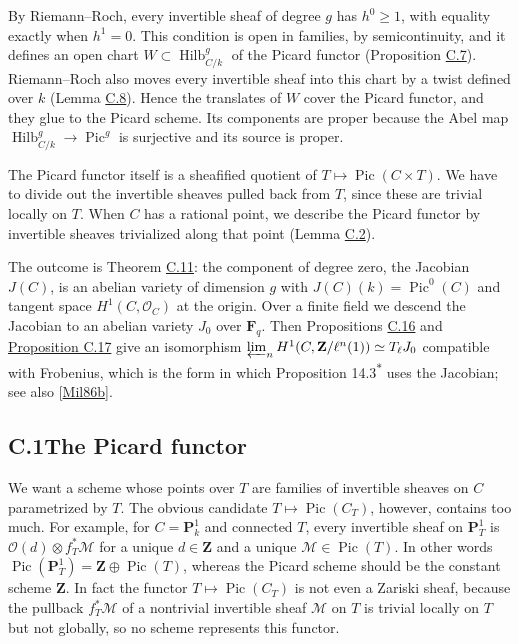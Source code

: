 \documentclass[11pt]{article}
\newcommand{\bpout}[1]{#1\textsuperscript{\hyperlink{bp-outside}{\ensuremath{\ast}}}}
\begin{document}
By Riemann–Roch, every invertible sheaf of degree \(g\) has \(h^0\geq1\), with equality exactly when \(h^1=0\). This condition is open in families, by semicontinuity, and it defines an open chart \(W\subset\operatorname{Hilb}^{g}_{C/k}\) of the Picard functor (Proposition \hyperref[bp24]{C.7}). Riemann–Roch also moves every invertible sheaf into this chart by a twist defined over \(k\) (Lemma \hyperref[bp27]{C.8}). Hence the translates of \(W\) cover the Picard functor, and they glue to the Picard scheme. Its components are proper because the Abel map \(\operatorname{Hilb}^{g}_{C/k}\to\operatorname{Pic}^g\) is surjective and its source is proper.

The Picard functor itself is a sheafified quotient of \(T\mapsto\operatorname{Pic}(C\times T)\). We have to divide out the invertible sheaves pulled back from \(T\), since these are trivial locally on \(T\). When \(C\) has a rational point, we describe the Picard functor by invertible sheaves trivialized along that point (Lemma \hyperref[bp7]{C.2}).

The outcome is Theorem \hyperref[bp36]{C.11}: the component of degree zero, the Jacobian \(J(C)\), is an abelian variety of dimension \(g\) with \(J(C)(k)=\operatorname{Pic}^0(C)\) and tangent space \(H^1(C,\mathcal O_C)\) at the origin. Over a finite field we descend the Jacobian to an abelian variety \(J_0\) over \(\mathbf F_q\). Then Propositions \hyperref[bp49]{C.16} and \hyperref[bp52]{Proposition C.17} give an isomorphism \(\varprojlim_nH^1(C,\mathbf Z/\ell^n(1))\simeq T_\ell J_0\) compatible with Frobenius, which is the form in which Proposition \bpout{14.3} uses the Jacobian; see also [\hyperref[bp54]{Mil86b}].

\subsection*{\texorpdfstring{C.1\quad The Picard functor}{C.1 The Picard functor}}
\label{bp3}%
\label{bp4}%
We want a scheme whose points over \(T\) are families of invertible sheaves on \(C\) parametrized by \(T\). The obvious candidate \(T\mapsto\operatorname{Pic}(C_T)\), however, contains too much. For example, for \(C=\mathbf P^1_k\) and connected \(T\), every invertible sheaf on \(\mathbf P^1_T\) is \(\mathcal O(d)\otimes f_T^*\mathcal M\) for a unique \(d\in\mathbf Z\) and a unique \(\mathcal M\in\operatorname{Pic}(T)\). In other words \(\operatorname{Pic}(\mathbf P^1_T)=\mathbf Z\oplus\operatorname{Pic}(T)\), whereas the Picard scheme should be the constant scheme \(\mathbf Z\). In fact the functor \(T\mapsto\operatorname{Pic}(C_T)\) is not even a Zariski sheaf, because the pullback \(f_T^*\mathcal M\) of a nontrivial invertible sheaf \(\mathcal M\) on \(T\) is trivial locally on \(T\) but not globally, so no scheme represents this functor.
\end{document}
